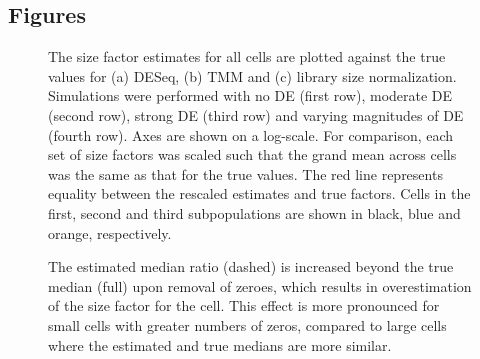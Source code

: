 \documentclass{bmcart}
\begin{document}
\begin{backmatter}



\section*{Figures}
\begin{figure}[!h]
\caption{
    The size factor estimates for all cells are plotted against the true values for (a) DESeq,
        (b) TMM and (c) library size normalization.
    Simulations were performed with no DE (first row), moderate DE (second row), strong DE (third row) and varying magnitudes of DE (fourth row).
    Axes are shown on a log-scale.
    For comparison, each set of size factors was scaled such that the grand mean across cells was the same as that for the true values.
    The red line represents equality between the rescaled estimates and true factors.
    Cells in the first, second and third subpopulations are shown in black, blue and orange, respectively.
}
\label{fig:existing_sim}
\end{figure}

\begin{figure}[!h]
\caption{
    The estimated median ratio (dashed) is increased beyond the true median (full) upon removal of zeroes, which results in overestimation of the size factor for the cell.
    This effect is more pronounced for small cells with greater numbers of zeros, compared to large cells where the estimated and true medians are more similar.
}
\label{fig:zero_fail}
\end{figure}


\end{backmatter}
\end{document}
